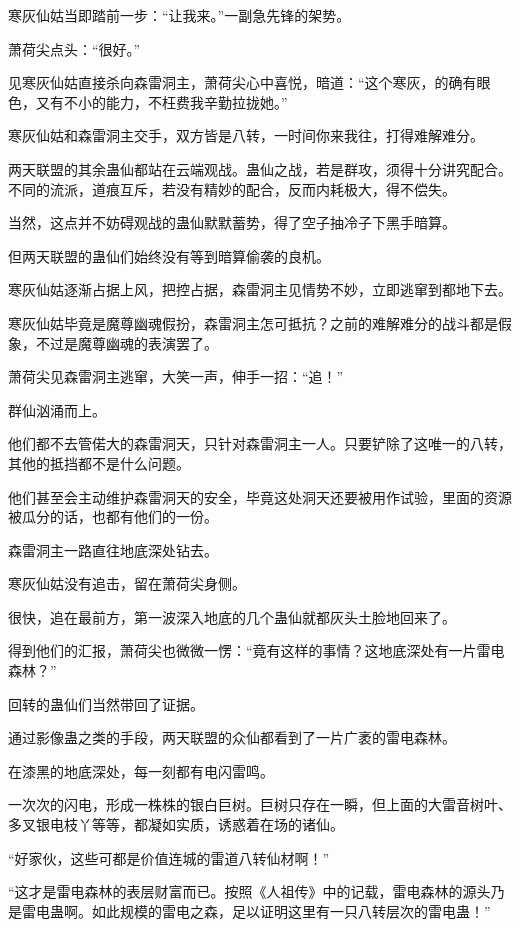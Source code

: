 \begin{this_body}
寒灰仙姑当即踏前一步：“让我来。”一副急先锋的架势。

萧荷尖点头：“很好。”

见寒灰仙姑直接杀向森雷洞主，萧荷尖心中喜悦，暗道：“这个寒灰，的确有眼色，又有不小的能力，不枉费我辛勤拉拢她。”

寒灰仙姑和森雷洞主交手，双方皆是八转，一时间你来我往，打得难解难分。

两天联盟的其余蛊仙都站在云端观战。蛊仙之战，若是群攻，须得十分讲究配合。不同的流派，道痕互斥，若没有精妙的配合，反而内耗极大，得不偿失。

当然，这点并不妨碍观战的蛊仙默默蓄势，得了空子抽冷子下黑手暗算。

但两天联盟的蛊仙们始终没有等到暗算偷袭的良机。

寒灰仙姑逐渐占据上风，把控占据，森雷洞主见情势不妙，立即逃窜到都地下去。

寒灰仙姑毕竟是魔尊幽魂假扮，森雷洞主怎可抵抗？之前的难解难分的战斗都是假象，不过是魔尊幽魂的表演罢了。

萧荷尖见森雷洞主逃窜，大笑一声，伸手一招：“追！”

群仙汹涌而上。

他们都不去管偌大的森雷洞天，只针对森雷洞主一人。只要铲除了这唯一的八转，其他的抵挡都不是什么问题。

他们甚至会主动维护森雷洞天的安全，毕竟这处洞天还要被用作试验，里面的资源被瓜分的话，也都有他们的一份。

森雷洞主一路直往地底深处钻去。

寒灰仙姑没有追击，留在萧荷尖身侧。

很快，追在最前方，第一波深入地底的几个蛊仙就都灰头土脸地回来了。

得到他们的汇报，萧荷尖也微微一愣：“竟有这样的事情？这地底深处有一片雷电森林？”

回转的蛊仙们当然带回了证据。

通过影像蛊之类的手段，两天联盟的众仙都看到了一片广袤的雷电森林。

在漆黑的地底深处，每一刻都有电闪雷鸣。

一次次的闪电，形成一株株的银白巨树。巨树只存在一瞬，但上面的大雷音树叶、多叉银电枝丫等等，都凝如实质，诱惑着在场的诸仙。

“好家伙，这些可都是价值连城的雷道八转仙材啊！”

“这才是雷电森林的表层财富而已。按照《人祖传》中的记载，雷电森林的源头乃是雷电蛊啊。如此规模的雷电之森，足以证明这里有一只八转层次的雷电蛊！”


\end{this_body}
